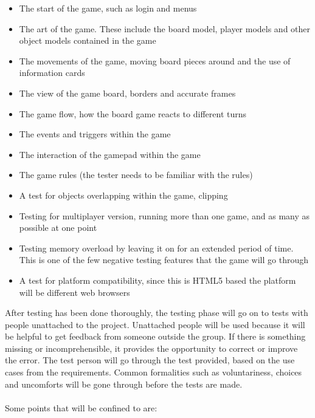 \begin{itemize} \setlength{\itemsep}{0cm}\setlength{\parskip}{0cm}
	\item The start of the game, such as login and menus
	\item The art of the game. These include the board model, player models and other object models contained in the game
	\item The movements of the game, moving board pieces around and the use of information cards 
	\item The view of the game board, borders and accurate frames
	\item The game flow, how the board game reacts to different turns
	\item The events and triggers within the game
	\item The interaction of the gamepad within the game
	\item The game rules (the tester needs to be familiar with the rules)
	\item A test for objects overlapping within the game, clipping
	\item Testing for multiplayer version, running more than one game, and as many as possible at one point
	\item Testing memory overload by leaving it on for an extended period of time. This is one of the few negative testing features that the game will go through
	\item A test for platform compatibility, since this is HTML5 based the platform will be different web browsers
\end{itemize}
\noindent
After testing has been done thoroughly, the testing phase will go on to tests with people unattached to the project. Unattached people will be used because it will be helpful to get feedback from someone outside the group. If there is something missing or incomprehensible, it provides the opportunity to correct or improve the error. The test person will go through the test provided, based on the use cases from the requirements. Common formalities such as voluntariness, choices and uncomforts will be gone through before the tests are made.\\
\\
Some points that will be confined to are:

